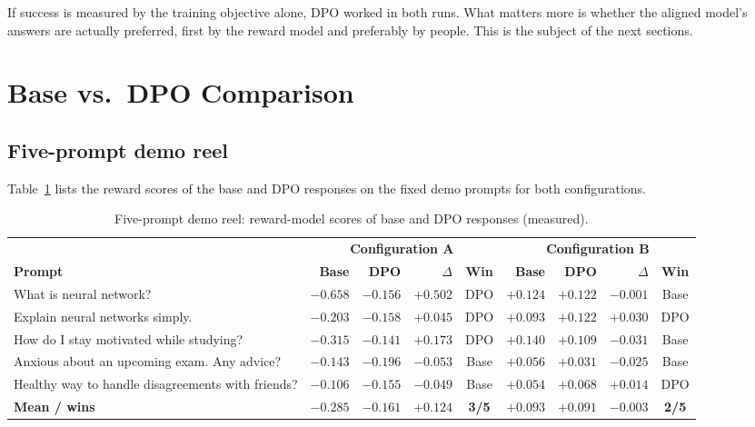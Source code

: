 If success is measured by the training objective alone, DPO worked in both runs. What matters more is whether the aligned model's answers are actually preferred, first by the reward model and preferably by people. This is the subject of the next sections.

\section{Base vs.\ DPO Comparison}
\label{sec:res-compare}

\subsection{Five-prompt demo reel}
Table~\ref{tab:demo} lists the reward scores of the base and DPO responses on the fixed demo prompts for both configurations.

\begin{table}[!htbp]
\centering
\caption[Five-prompt demo results]{Five-prompt demo reel: reward-model scores of base and DPO responses (measured).}
\label{tab:demo}
\footnotesize\setlength{\tabcolsep}{4pt}
\begin{tabularx}{\textwidth}{@{}>{\raggedright\arraybackslash}Xrrrcrrrc@{}}
\toprule
 & \multicolumn{4}{c}{\textbf{Configuration A}} & \multicolumn{4}{c}{\textbf{Configuration B}}\\
\cmidrule(lr){2-5}\cmidrule(l){6-9}
\textbf{Prompt} & \textbf{Base} & \textbf{DPO} & \textbf{$\Delta$} & \textbf{Win} & \textbf{Base} & \textbf{DPO} & \textbf{$\Delta$} & \textbf{Win}\\
\midrule
What is neural network? & $-0.658$ & $-0.156$ & $+0.502$ & DPO & $+0.124$ & $+0.122$ & $-0.001$ & Base\\
Explain neural networks simply. & $-0.203$ & $-0.158$ & $+0.045$ & DPO & $+0.093$ & $+0.122$ & $+0.030$ & DPO\\
How do I stay motivated while studying? & $-0.315$ & $-0.141$ & $+0.173$ & DPO & $+0.140$ & $+0.109$ & $-0.031$ & Base\\
Anxious about an upcoming exam. Any advice? & $-0.143$ & $-0.196$ & $-0.053$ & Base & $+0.056$ & $+0.031$ & $-0.025$ & Base\\
Healthy way to handle disagreements with friends? & $-0.106$ & $-0.155$ & $-0.049$ & Base & $+0.054$ & $+0.068$ & $+0.014$ & DPO\\
\midrule
\textbf{Mean / wins} & $-0.285$ & $-0.161$ & $\mathbf{+0.124}$ & \textbf{3/5} & $+0.093$ & $+0.091$ & $\mathbf{-0.003}$ & \textbf{2/5}\\
\bottomrule
\end{tabularx}
\end{table}

